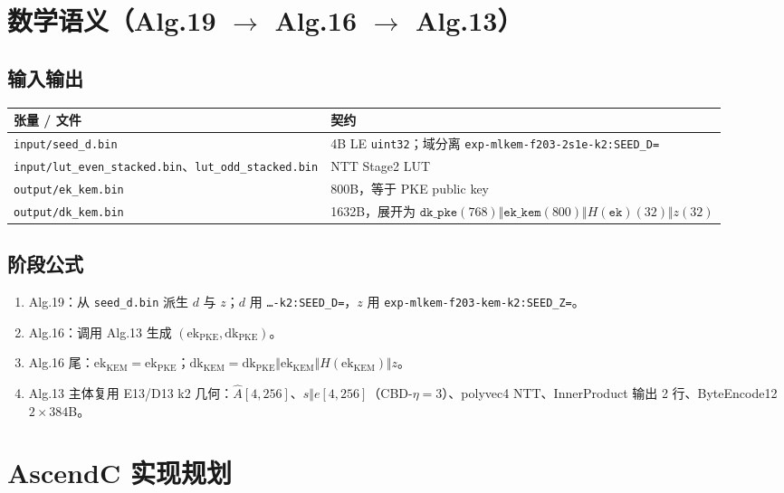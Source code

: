 \documentclass[UTF8,a4paper,11pt]{ctexart}
\begin{document}
\section{数学语义（Alg.19 $\to$ Alg.16 $\to$ Alg.13）}

\subsection{输入输出}

\begin{longtable}{@{}L{3.5cm}L{9.8cm}@{}}
\toprule
张量 / 文件 & 契约 \\
\midrule
\texttt{input/seed\_d.bin} & 4B LE \texttt{uint32}；域分离 \texttt{exp-mlkem-f203-2s1e-k2:SEED\_D=} \\
\texttt{input/lut\_even\_stacked.bin}、\texttt{lut\_odd\_stacked.bin} & NTT Stage2 LUT \\
\texttt{output/ek\_kem.bin} & 800B，等于 PKE public key \\
\texttt{output/dk\_kem.bin} & 1632B，展开为 \(\texttt{dk\_pke}(768)\Vert\texttt{ek\_kem}(800)\Vert H(\texttt{ek})(32)\Vert z(32)\) \\
\bottomrule
\end{longtable}

\subsection{阶段公式}

\begin{enumerate}
  \item Alg.19：从 \texttt{seed\_d.bin} 派生 $d$ 与 $z$；$d$ 用 \texttt{…-k2:SEED\_D=}，$z$ 用 \texttt{exp-mlkem-f203-kem-k2:SEED\_Z=}。
  \item Alg.16：调用 Alg.13 生成 $(\mathrm{ek}_{\mathrm{PKE}},\mathrm{dk}_{\mathrm{PKE}})$。
  \item Alg.16 尾：$\mathrm{ek}_{\mathrm{KEM}}=\mathrm{ek}_{\mathrm{PKE}}$；$\mathrm{dk}_{\mathrm{KEM}}=\mathrm{dk}_{\mathrm{PKE}}\Vert\mathrm{ek}_{\mathrm{KEM}}\Vert H(\mathrm{ek}_{\mathrm{KEM}})\Vert z$。
  \item Alg.13 主体复用 E13/D13 k2 几何：$\hat A[4,256]$、$s\Vert e[4,256]$（CBD-$\eta=3$）、polyvec4 NTT、InnerProduct 输出 2 行、ByteEncode12 $2\times384$B。
\end{enumerate}

\section{AscendC 实现规划}
\end{document}
